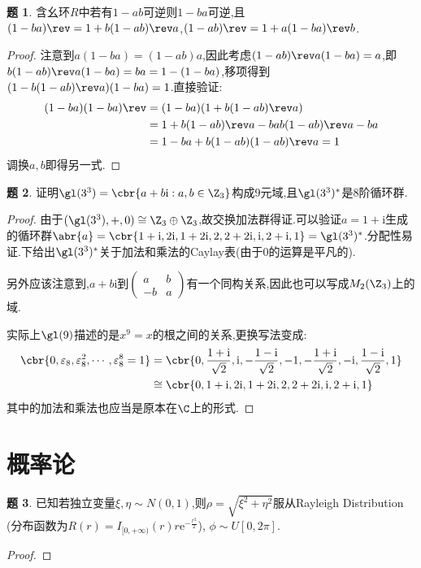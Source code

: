 \documentclass{article}
\newcommand{\matrixtwo}[4]{\begin{pmatrix}#1&#2\\#3&#4 \end{pmatrix}}
\renewcommand{\i}{\mathrm{i}}
\theoremstyle{definition}
\newtheorem{exercise}{题}[section]
\begin{document}
\begin{exercise}
    含幺环$R$中若有$1-ab$可逆则$1-ba$可逆,且$(1-ba)\rev=1+b(1-ab)\rev a$,$(1-ab)\rev=1+a(1-ba)\rev b$.
\end{exercise}
\begin{proof}
    注意到$a(1-ba)=(1-ab)a$,因此考虑$(1-ab)\rev a(1-ba)=a$,即$b(1-ab)\rev a(1-ba)=ba=1-(1-ba)$,移项得到$(1-b(1-ab)\rev a)(1-ba)=1$.直接验证:
$$\begin{aligned}
    (1-ba)(1-ba)\rev &=(1-ba)(1+b(1-ab)\rev a)\\
    &=1+b(1-ab)\rev a-bab(1-ab)\rev a-ba\\
    &=1-ba+b(1-ab)(1-ab)\rev a=1
\end{aligned}$$
调换$a,b$即得另一式.
\end{proof}

\begin{exercise}
    证明$\gl(3^3)=\cbr{a+b\i:a,b\in \Z_3}$构成9元域,且$\gl(3^3)^*$是8阶循环群.
\end{exercise}
\begin{proof}
    由于$(\gl(3^3),+,0)\cong \Z_3\oplus \Z_3$,故交换加法群得证.可以验证$a=1+\i$生成的循环群$\abr{a}=\cbr{1+\i,2\i,1+2\i,2,2+2\i,\i,2+\i,1}=\gl(3^3)^*$.分配性易证.下给出$\gl(3^3)^*$关于加法和乘法的Caylay表(由于0的运算是平凡的).

    另外应该注意到,$a+b\i$到$\matrixtwo{a}{b}{-b}{a}$有一个同构关系,因此也可以写成$M_2(\Z_3)$上的域.

    实际上$\gl(9)$描述的是$x^9=x$的根之间的关系,更换写法变成:
$$\begin{aligned}
    \cbr{0,\varepsilon_8,\varepsilon_8^2,\cdots,\varepsilon_8^8=1}&=\cbr{0,\frac{1+\i}{\sqrt{2}},\i,-\frac{1-\i}{\sqrt{2}},-1,-\frac{1+\i}{\sqrt{2}},-\i,\frac{1-\i}{\sqrt{2}},1}\\
    &\cong\cbr{0,1+\i,2\i,1+2\i,2,2+2\i,\i,2+\i,1}
\end{aligned}$$
其中的加法和乘法也应当是原本在$\C$上的形式.
\end{proof}

\section{概率论}
\begin{exercise}
已知若独立变量$\xi,\eta\sim N(0,1)$,则$\rho=\sqrt{\xi^2+\eta^2}$服从Rayleigh Distribution (分布函数为$R(r)=I_{[0,+\infty)}(r)r\mathrm{e}^{-\frac{r^2}{2}}$), $\phi\sim U[0,2\pi]$.
\end{exercise}
\begin{proof}
    
\end{proof}
\end{document}
